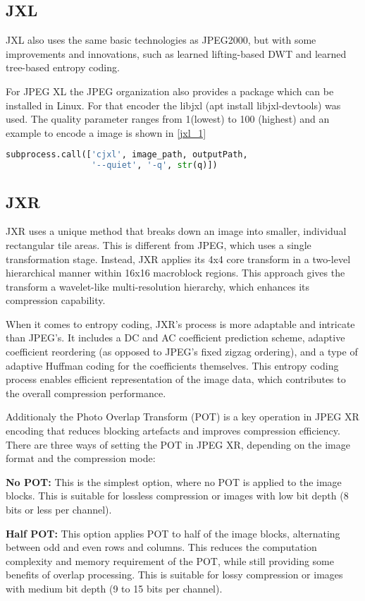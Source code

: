 \subsection{JXL}
JXL also uses the same basic technologies as JPEG2000, but with some improvements and innovations, such as learned lifting-based DWT and learned tree-based entropy coding.

For JPEG XL the JPEG organization also provides a package which can be installed in Linux. For that encoder the libjxl (apt install libjxl-devtools) was used. The quality parameter ranges from 1(lowest) to 100 (highest) and an example to encode a image is shown in \ref{jxl_1}
\begin{lstlisting}[label={jxl_1}, language=Python, caption=Encode JPEG XL]
subprocess.call(['cjxl', image_path, outputPath,
                 '--quiet', '-q', str(q)])
\end{lstlisting}
\subsection{JXR}
JXR uses a unique method that breaks down an image into smaller, individual rectangular tile areas. This is different from JPEG, which uses a single transformation stage. Instead, JXR applies its 4x4 core transform in a two-level hierarchical manner within 16x16 macroblock regions. This approach gives the transform a wavelet-like multi-resolution hierarchy, which enhances its compression capability.

When it comes to entropy coding, JXR’s process is more adaptable and intricate than JPEG’s. It includes a DC and AC coefficient prediction scheme, adaptive coefficient reordering (as opposed to JPEG’s fixed zigzag ordering), and a type of adaptive Huffman coding for the coefficients themselves. This entropy coding process enables efficient representation of the image data, which contributes to the overall compression performance.

Additionaly the Photo Overlap Transform (POT) is a key operation in JPEG XR encoding that reduces blocking artefacts and improves compression efficiency. There are three ways of setting the POT in JPEG XR, depending on the image format and the compression mode:

\textbf{No POT:} This is the simplest option, where no POT is applied to the image blocks. This is suitable for lossless compression or images with low bit depth (8 bits or less per channel).

\textbf{Half POT:} This option applies POT to half of the image blocks, alternating between odd and even rows and columns. This reduces the computation complexity and memory requirement of the POT, while still providing some benefits of overlap processing. This is suitable for lossy compression or images with medium bit depth (9 to 15 bits per channel).

